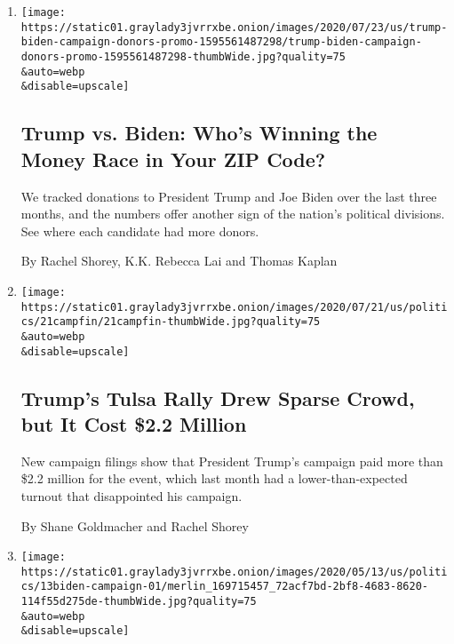 \begin{enumerate}
\def\labelenumi{\arabic{enumi}.}
\item
  \href{/interactive/2020/07/24/us/politics/trump-biden-campaign-donors.html}{}

  \texttt{[image: https://static01.graylady3jvrrxbe.onion/images/2020/07/23/us/trump-biden-campaign-donors-promo-1595561487298/trump-biden-campaign-donors-promo-1595561487298-thumbWide.jpg?quality=75\\\&auto=webp\\\&disable=upscale]}

  \hypertarget{trump-vs-biden-whos-winning-the-money-race-in-your-zip-code}{%
  \subsection{Trump vs. Biden: Who's Winning the Money Race in Your ZIP
  Code?}\label{trump-vs-biden-whos-winning-the-money-race-in-your-zip-code}}

  We tracked donations to President Trump and Joe Biden over the last
  three months, and the numbers offer another sign of the nation's
  political divisions. See where each candidate had more donors.

  By Rachel Shorey, K.K. Rebecca Lai and Thomas Kaplan
\item
  \href{/2020/07/21/us/politics/trump-tulsa-rally-cost.html}{}

  \texttt{[image: https://static01.graylady3jvrrxbe.onion/images/2020/07/21/us/politics/21campfin/21campfin-thumbWide.jpg?quality=75\\\&auto=webp\\\&disable=upscale]}

  \hypertarget{trumps-tulsa-rally-drew-sparse-crowd-but-it-cost-22-million}{%
  \subsection{Trump's Tulsa Rally Drew Sparse Crowd, but It Cost \$2.2
  Million}\label{trumps-tulsa-rally-drew-sparse-crowd-but-it-cost-22-million}}

  New campaign filings show that President Trump's campaign paid more
  than \$2.2 million for the event, which last month had a
  lower-than-expected turnout that disappointed his campaign.

  By Shane Goldmacher and Rachel Shorey
\item
  \href{/2020/05/13/us/politics/joe-biden-donald-trump-2020.html}{}

  \texttt{[image: https://static01.graylady3jvrrxbe.onion/images/2020/05/13/us/politics/13biden-campaign-01/merlin\_169715457\_72acf7bd-2bf8-4683-8620-114f55d275de-thumbWide.jpg?quality=75\\\&auto=webp\\\&disable=upscale]}


\end{enumerate}
